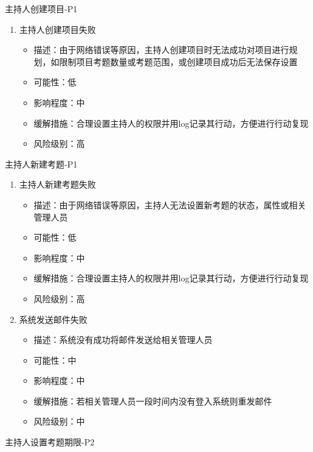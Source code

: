\documentclass[hyperref, a4paper]{ctexart}
\providecommand{\tightlist}{%
  \setlength{\itemsep}{0pt}\setlength{\parskip}{0pt}}
\begin{document}
主持人创建项目-P1

\begin{enumerate}
\def\labelenumi{\arabic{enumi}.}
\tightlist
\item
  主持人创建项目失败

  \begin{itemize}
  \tightlist
  \item
    描述：由于网络错误等原因，主持人创建项目时无法成功对项目进行规划，如限制项目考题数量或考题范围，或创建项目成功后无法保存设置
  \item
    可能性：低
  \item
    影响程度：中
  \item
    缓解措施：合理设置主持人的权限并用log记录其行动，方便进行行动复现
  \item
    风险级别：高
  \end{itemize}
\end{enumerate}

主持人新建考题-P1

\begin{enumerate}
\def\labelenumi{\arabic{enumi}.}
\tightlist
\item
  主持人新建考题失败

  \begin{itemize}
  \tightlist
  \item
    描述：由于网络错误等原因，主持人无法设置新考题的状态，属性或相关管理人员
  \item
    可能性：低
  \item
    影响程度：中
  \item
    缓解措施：合理设置主持人的权限并用log记录其行动，方便进行行动复现
  \item
    风险级别：高
  \end{itemize}
\item
  系统发送邮件失败

  \begin{itemize}
  \tightlist
  \item
    描述：系统没有成功将邮件发送给相关管理人员
  \item
    可能性：中
  \item
    影响程度：中
  \item
    缓解措施：若相关管理人员一段时间内没有登入系统则重发邮件
  \item
    风险级别：中
  \end{itemize}
\end{enumerate}

主持人设置考题期限-P2
\end{document}
